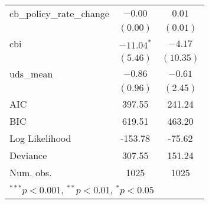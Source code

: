 \begin{tabular}{l c c }
cb\_policy\_rate\_change        & $-0.00$       & $0.01$      \\
                                & $(0.00)$      & $(0.01)$    \\
cbi                             & $-11.04^{*}$  & $-4.17$     \\
                                & $(5.46)$      & $(10.35)$   \\
uds\_mean                       & $-0.86$       & $-0.61$     \\
                                & $(0.96)$      & $(2.45)$    \\
\hline
AIC                             & 397.55        & 241.24      \\
BIC                             & 619.51        & 463.20      \\
Log Likelihood                  & -153.78       & -75.62      \\
Deviance                        & 307.55        & 151.24      \\
Num. obs.                       & 1025          & 1025        \\
\hline
\multicolumn{3}{l}{\scriptsize{$^{***}p<0.001$, $^{**}p<0.01$, $^*p<0.05$}}
\end{tabular}
